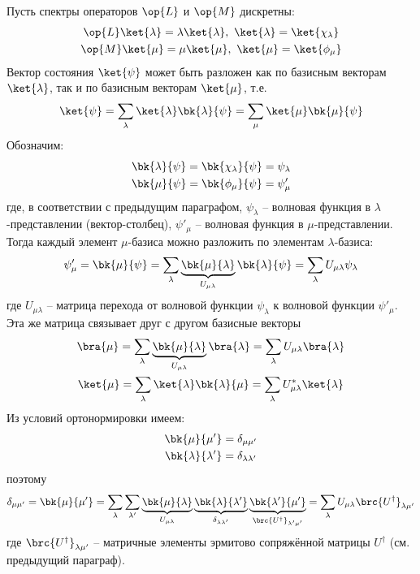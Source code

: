 Пусть спектры операторов $\op{L}$ и $\op{M}$ дискретны:
$$
\begin{gathered}
\op{L}\ket{\lambda} = \lambda\ket{\lambda},~ \ket{\lambda}=\ket{\chi_\lambda} \\
\op{M}\ket{\mu} = \mu\ket{\mu},~ \ket{\mu}=\ket{\phi_\mu}
\end{gathered}
$$%
%
Вектор состояния $\ket{\psi}$ может быть разложен как по базисным векторам $\ket{\lambda}$, так и по базисным векторам $\ket{\mu}$, т.е.%
%
$$
\ket{\psi}=\sum_\lambda \ket{\lambda}\bk{\lambda}{\psi}=\sum_\mu \ket{\mu}\bk{\mu}{\psi}
$$%
%
Обозначим:%
$$
\begin{gathered}
\bk{\lambda}{\psi} =\bk{\chi_\lambda}{\psi}= \psi_\lambda \\
\bk{\mu}{\psi}=\bk{\phi_\mu}{\psi}=\psi'_\mu
\end{gathered}
$$%
%
где, в соответствии с предыдущим параграфом, $\psi_\lambda$ -- волновая функция в $\lambda$-представлении (вектор-столбец), $\psi'_\mu$ -- волновая функция в $\mu$-представлении. Тогда каждый элемент $\mu$-базиса можно разложить по элементам $\lambda$-базиса:%
%
\begin{equation}
\label{eq:6_2_1}
\psi'_\mu = \bk{\mu}{\psi} =
	\sum_\lambda \underbrace{\bk{\mu}{\lambda}}_{U_{\mu\lambda}}\bk{\lambda}{\psi} =
	\sum_\lambda U_{\mu\lambda}\psi_\lambda
\end{equation}%
%
где $U_{\mu\lambda}$ -- матрица перехода от волновой функции $\psi_\lambda$ к волновой функции $\psi'_\mu$. Эта же матрица связывает друг с другом базисные векторы%
%
$$
\begin{gathered}
\bra{\mu}=\sum_\lambda \underbrace{\bk{\mu}{\lambda}}_{U_{\mu\lambda}} \bra{\lambda} = \sum_\lambda U_{\mu\lambda}\bra{\lambda} \\
\ket{\mu}=\sum_\lambda \ket{\lambda} \bk{\lambda}{\mu} = \sum_\lambda U^*_{\mu\lambda}\ket{\lambda} 
\end{gathered}
$$%
%
Из условий ортонормировки имеем:
$$
\begin{gathered}
\bk{\mu}{\mu'}=\delta_{\mu\mu'}\\
\bk{\lambda}{\lambda'}=\delta_{\lambda\lambda'}
\end{gathered}
$$%
%
поэтому
$$
\delta_{\mu\mu'} = \bk{\mu}{\mu'} =
	\sum_\lambda \sum_{\lambda'} \underbrace{\bk{\mu}{\lambda}}_{U_{\mu\lambda}}
		\underbrace{\bk{\lambda}{\lambda'}}_{\delta_{\lambda\lambda'}}
		\underbrace{\bk{\lambda'}{\mu'}}_{\brc{U^\dag}_{\lambda'\mu'}} =
	\sum_\lambda U_{\mu\lambda}\brc{U^\dag}_{\lambda\mu'}
$$%
%
где $\brc{U^\dag}_{\lambda\mu'}$ -- матричные элементы эрмитово сопряжённой матрицы $U^\dag$ (см. предыдущий параграф).

